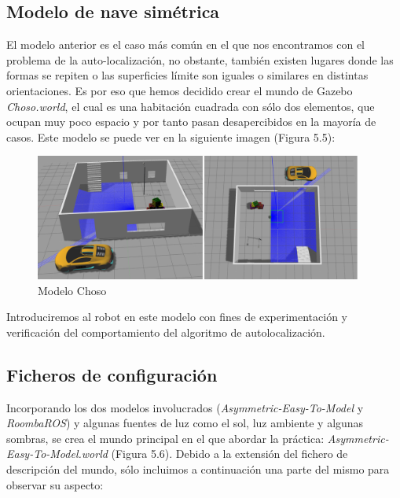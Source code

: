 \subsection{Modelo de nave simétrica}
El modelo anterior es el caso más común en el que nos encontramos con el problema de la auto-localización, no obstante, también existen lugares donde las formas se repiten o las superficies límite son iguales o similares en distintas orientaciones. Es por eso que hemos decidido crear el mundo de Gazebo \textit{Choso.world}, el cual es una habitación cuadrada con sólo dos elementos, que ocupan muy poco espacio y por tanto pasan desapercibidos en la mayoría de casos. Este modelo se puede ver en la siguiente imagen (Figura 5.5):

\begin{figure}[H]
  \begin{center}
    \includegraphics[width=0.96\textwidth]{figures/chosoworld.png}
		\caption{Modelo Choso}
		\label{fig.choso}
		\end{center}
\end{figure}

Introduciremos al robot en este modelo con fines de experimentación y verificación del comportamiento del algoritmo de autolocalización.

\subsection{Ficheros de configuración}
Incorporando los dos modelos involucrados (\textit{Asymmetric-Easy-To-Model} y \textit{RoombaROS}) y algunas fuentes de luz como el sol, luz ambiente y algunas sombras, se crea el mundo principal en el que abordar la práctica: \textit{Asymmetric-Easy-To-Model.world} (Figura 5.6). Debido a la extensión del fichero de descripción del mundo, sólo incluimos a continuación una parte del mismo para observar su aspecto:

